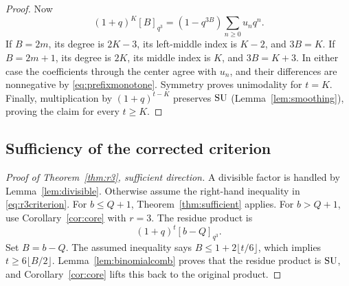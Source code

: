 \documentclass[11pt]{article}
\theoremstyle{research}
\theoremstyle{definition}
\newcommand{\qir}[2]{[#1]_{q^{#2}}}
\newcommand{\SU}{\textup{SU}}
\numberwithin{equation}{section}
\begin{document}
\begin{proof}
Now
\[
 (1+q)^K\qir B3=(1-q^{3B})\sum_{n\ge0}u_nq^n.
\]
If $B=2m$, its degree is $2K-3$, its left-middle index is $K-2$,
and $3B=K$. If $B=2m+1$, its degree is $2K$, its middle index is $K$,
and $3B=K+3$. In either case the coefficients through the center agree
with $u_n$, and their differences are nonnegative by
\eqref{eq:prefixmonotone}. Symmetry proves unimodality for $t=K$.
Finally, multiplication by $(1+q)^{t-K}$ preserves $\SU$
(Lemma~\ref{lem:smoothing}), proving the claim for every $t\ge K$.
\end{proof}

\subsection{Sufficiency of the corrected criterion}
\begin{proof}[Proof of Theorem~\ref{thm:r3}, sufficient direction]
A divisible factor is handled by Lemma~\ref{lem:divisible}.
Otherwise assume the right-hand inequality in \eqref{eq:r3criterion}.
For $b\le Q+1$, Theorem~\ref{thm:sufficient} applies.
For $b>Q+1$, use Corollary~\ref{cor:core} with $r=3$.
The residue product is
\[
 (1+q)^t\qir{b-Q}{3}.
\]
Set $B=b-Q$. The assumed inequality says
$B\le1+2\lfloor t/6\rfloor$, which implies
$t\ge6\lfloor B/2\rfloor$.
Lemma~\ref{lem:binomialcomb} proves that the residue product is $\SU$,
and Corollary~\ref{cor:core} lifts this back to the original product.
\end{proof}
\end{document}
